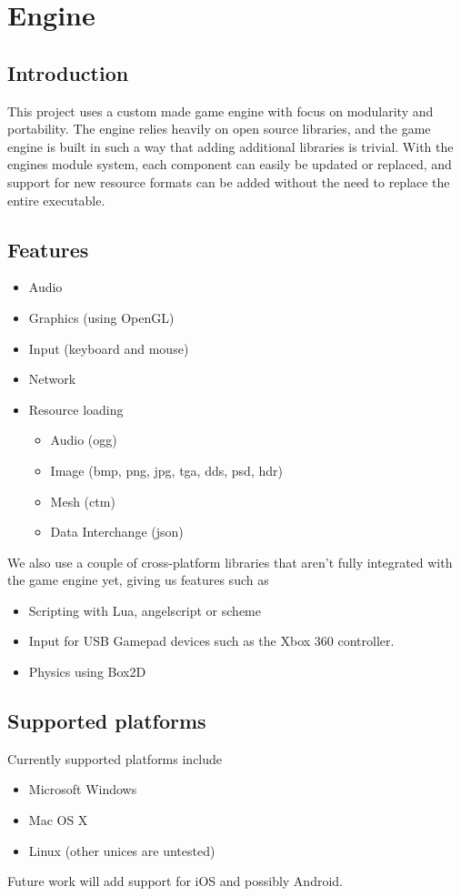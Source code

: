 
\chapter{Engine}
\section{Introduction}
This project uses a custom made game engine with focus on modularity and portability. The engine relies heavily on open source libraries, and the game engine is built in such a way that adding additional libraries is trivial. With the engines module system, each component can easily be updated or replaced, and support for new resource formats can be added without the need to replace the entire executable.

 \section{Features}
 \begin{itemize}
 \item Audio
 \item Graphics (using OpenGL)
 \item Input (keyboard and mouse)
 \item Network
 \item Resource loading
 	\begin{itemize}
 		\item Audio (ogg)
 		\item Image (bmp, png, jpg, tga, dds, psd, hdr)
 		\item Mesh (ctm)
 		\item Data Interchange (json)
 	\end{itemize}
 \end{itemize}

We also use a couple of cross-platform libraries that aren't fully integrated with the game engine yet, giving us features such as
\begin{itemize}
\item Scripting with Lua, angelscript or scheme
\item Input for USB Gamepad devices such as the Xbox 360 controller.
\item Physics using Box2D
\end{itemize}

\section{Supported platforms}
Currently supported platforms include
\begin{itemize}
\item Microsoft Windows
\item Mac OS X
\item Linux (other unices are untested)
\end{itemize}
Future work will add support for iOS and possibly Android.

